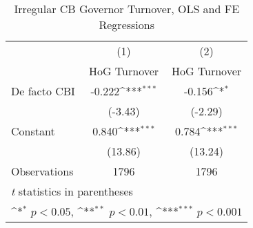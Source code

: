 \begin{table}[htbp]\centering
\def\sym#1{\ifmmode^{#1}\else\(^{#1}\)\fi}
\caption{Irregular CB Governor Turnover, OLS and FE Regressions \label{irregtdHOGalone}}
\begin{tabular}{l*{2}{c}}
\toprule
                                        &\multicolumn{1}{c}{(1)}&\multicolumn{1}{c}{(2)}\\
                                        &\multicolumn{1}{c}{HoG Turnover}&\multicolumn{1}{c}{HoG Turnover}\\
\midrule
De facto CBI                            &   -0.222\sym{***}&   -0.156\sym{*}  \\
                                        &  (-3.43)         &  (-2.29)         \\
\addlinespace
Constant                                &    0.840\sym{***}&    0.784\sym{***}\\
                                        &  (13.86)         &  (13.24)         \\
\midrule
Observations                            &     1796         &     1796         \\
\bottomrule
\multicolumn{3}{l}{\footnotesize \textit{t} statistics in parentheses}\\
\multicolumn{3}{l}{\footnotesize \sym{*} \(p<0.05\), \sym{**} \(p<0.01\), \sym{***} \(p<0.001\)}\\
\end{tabular}
\end{table}

